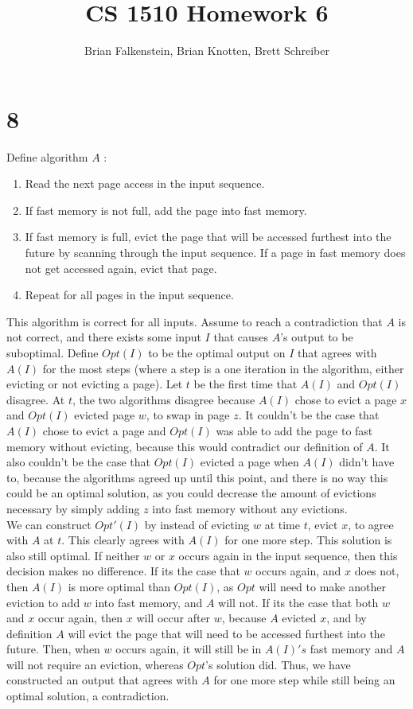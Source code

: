 \documentclass[letterpaper,notitlepage,twoside]{article}
\title{CS 1510 Homework 6}
\author{Brian Falkenstein, Brian Knotten, Brett Schreiber}
\begin{document}
\maketitle

\section*{8}
Define algorithm $A$ : 
\begin{enumerate}
\item Read the next page access in the input sequence.
\item If fast memory is not full, add the page into fast memory. 
\item If fast memory is full, evict the page that will be accessed furthest into the future by scanning through the input sequence. If a page in fast memory does not get accessed again, evict that page.
\item Repeat for all pages in the input sequence.
\end{enumerate} 
This algorithm is correct for all inputs. Assume to reach a contradiction that $A$ is not correct, and there exists some input $I$ that causes $A$'s output to be suboptimal. Define $Opt(I)$ to be the optimal output on $I$ that agrees with $A(I)$ for the most steps (where a step is a one iteration in the algorithm, either evicting or not evicting a page). Let $t$ be the first time that $A(I)$ and $Opt(I)$ disagree. At $t$, the two algorithms disagree  because $A(I)$ chose to evict a page $x$ and $Opt(I)$ evicted page $w$, to swap in page $z$. It couldn't be the case that $A(I)$ chose to evict a page and $Opt(I)$ was able to add the page to fast memory without evicting, because this would contradict our definition of $A$. It also couldn't be the case that $Opt(I)$ evicted a page when $A(I)$ didn't have to, because the algorithms agreed up until this point, and there is no way this could be an optimal solution, as you could decrease the amount of evictions necessary by simply adding $z$ into fast memory without any evictions. \\
We can construct $Opt'(I)$ by instead of evicting $w$ at time $t$, evict $x$, to agree with $A$ at $t$. This clearly agrees with $A(I)$ for one more step. This solution is also still optimal. If neither $w$ or $x$ occurs again in the input sequence, then this decision makes no difference. If its the case that $w$ occurs again, and $x$ does not, then $A(I)$ is more optimal than $Opt(I)$, as $Opt$ will need to make another eviction to add $w$ into fast memory, and $A$ will not. If its the case that both $w$ and $x$ occur again, then $x$ will occur after $w$, because $A$ evicted $x$, and by definition $A$ will evict the page that will need to be accessed furthest into the future. Then, when $w$ occurs again, it will still be in $A(I)'s$ fast memory and $A$ will not require an eviction, whereas $Opt$'s solution did. Thus, we have constructed an output that agrees with $A$ for one more step while still being an optimal solution, a contradiction. 
\end{document}
